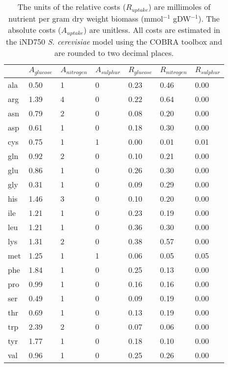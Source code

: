 \begin{table}%
\begin{footnotesize}
  \begin{tabular}{ p{1cm} *{6}{p{1.9cm}} }
  \toprule
      & $A_{glucose}$ & $A_{nitrogen}$ & $A_{sulphur}$ & $R_{glucose}$ & $R_{nitrogen}$ & $R_{sulphur}$ \\ \midrule
      ala & 0.50 & 1 & 0 & 0.23 & 0.46 & 0.00 \\
      arg & 1.39 & 4 & 0 & 0.22 & 0.64 & 0.00 \\
      asn & 0.79 & 2 & 0 & 0.08 & 0.20 & 0.00 \\
      asp & 0.61 & 1 & 0 & 0.18 & 0.30 & 0.00 \\
      cys & 0.75 & 1 & 1 & 0.00 & 0.01 & 0.01 \\
      gln & 0.92 & 2 & 0 & 0.10 & 0.21 & 0.00 \\
      glu & 0.86 & 1 & 0 & 0.26 & 0.30 & 0.00 \\
      gly & 0.31 & 1 & 0 & 0.09 & 0.29 & 0.00 \\
      his & 1.46 & 3 & 0 & 0.10 & 0.20 & 0.00 \\
      ile & 1.21 & 1 & 0 & 0.23 & 0.19 & 0.00 \\
      leu & 1.21 & 1 & 0 & 0.36 & 0.30 & 0.00 \\
      lys & 1.31 & 2 & 0 & 0.38 & 0.57 & 0.00 \\
      met & 1.25 & 1 & 1 & 0.06 & 0.05 & 0.05 \\
      phe & 1.84 & 1 & 0 & 0.25 & 0.13 & 0.00 \\
      pro & 0.99 & 1 & 0 & 0.16 & 0.16 & 0.00 \\
      ser & 0.49 & 1 & 0 & 0.09 & 0.19 & 0.00 \\
      thr & 0.69 & 1 & 0 & 0.13 & 0.19 & 0.00 \\
      trp & 2.39 & 2 & 0 & 0.07 & 0.06 & 0.00 \\
      tyr & 1.77 & 1 & 0 & 0.18 & 0.10 & 0.00 \\
      val & 0.96 & 1 & 0 & 0.25 & 0.26 & 0.00 \\ \bottomrule
  \end{tabular}
\end{footnotesize}
\caption[\emph{S. cerevisiae} estimated absolute and relative amino acid costs]{The units of the relative costs ($R_{uptake}$) are millimoles of nutrient per gram dry weight biomass (mmol$^{-1}$ gDW$^{-1}$). The absolute costs ($A_{uptake}$) are unitless. All costs are estimated in the iND750 \emph{S. cerevisiae} model using the COBRA toolbox and are rounded to two decimal places.}
\label{table:estimated_costs}
\end{table}%

